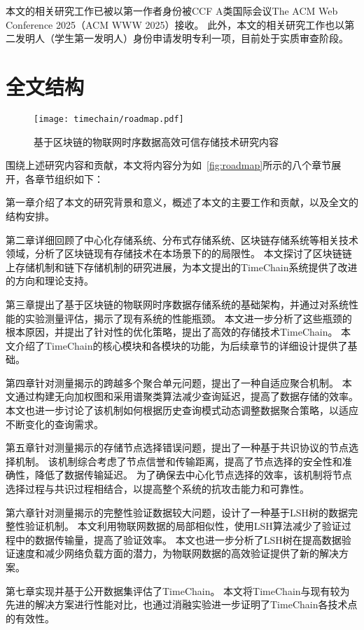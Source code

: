 本文的相关研究工作已被以第一作者身份被CCF A类国际会议The ACM Web Conference 2025（ACM WWW 2025）接收。
此外，本文的相关研究工作也以第二发明人（学生第一发明人）身份申请发明专利一项，目前处于实质审查阶段。

\section{全文结构}

\begin{figure}[t]
    \centering
    \texttt{[image: timechain/roadmap.pdf]}
    \caption{基于区块链的物联网时序数据高效可信存储技术研究内容}
    \label{fig:roadmap}
\end{figure}

围绕上述研究内容和贡献，本文将内容分为如~\autoref{fig:roadmap}所示的八个章节展开，各章节组织如下：

第一章介绍了本文的研究背景和意义，概述了本文的主要工作和贡献，以及全文的结构安排。

第二章详细回顾了中心化存储系统、分布式存储系统、区块链存储系统等相关技术领域，分析了区块链现有存储技术在本场景下的的局限性。
本文探讨了区块链链上存储机制和链下存储机制的研究进展，为本文提出的TimeChain系统提供了改进的方向和理论支持。

第三章提出了基于区块链的物联网时序数据存储系统的基础架构，并通过对系统性能的实验测量评估，揭示了现有系统的性能瓶颈。
本文进一步分析了这些瓶颈的根本原因，并提出了针对性的优化策略，提出了高效的存储技术TimeChain。
本文介绍了TimeChain的核心模块和各模块的功能，为后续章节的详细设计提供了基础。

第四章针对测量揭示的跨越多个聚合单元问题，提出了一种自适应聚合机制。
本文通过构建无向加权图和采用谱聚类算法减少查询延迟，提高了数据存储的效率。
本文也进一步讨论了该机制如何根据历史查询模式动态调整数据聚合策略，以适应不断变化的查询需求。

第五章针对测量揭示的存储节点选择错误问题，提出了一种基于共识协议的节点选择机制。
该机制综合考虑了节点信誉和传输距离，提高了节点选择的安全性和准确性，降低了数据传输延迟。
为了确保去中心化节点选择的效率，该机制将节点选择过程与共识过程相结合，以提高整个系统的抗攻击能力和可靠性。

第六章针对测量揭示的完整性验证数据较大问题，设计了一种基于LSH树的数据完整性验证机制。
本文利用物联网数据的局部相似性，使用LSH算法减少了验证过程中的数据传输量，提高了验证效率。
本文也进一步分析了LSH树在提高数据验证速度和减少网络负载方面的潜力，为物联网数据的高效验证提供了新的解决方案。

第七章实现并基于公开数据集评估了TimeChain。
本文将TimeChain与现有较为先进的解决方案进行性能对比，也通过消融实验进一步证明了TimeChain各技术点的有效性。

